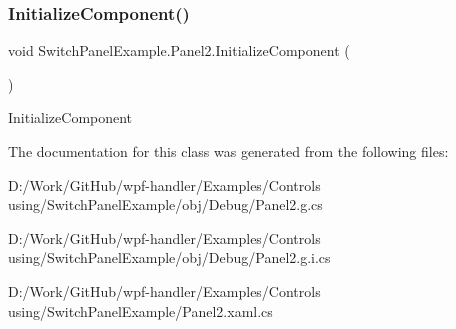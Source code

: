 \subsubsection{\texorpdfstring{Initialize\+Component()}{InitializeComponent()}\hspace{0.1cm}{\footnotesize\ttfamily [2/2]}}
{\footnotesize\ttfamily void Switch\+Panel\+Example.\+Panel2.\+Initialize\+Component (\begin{DoxyParamCaption}{ }\end{DoxyParamCaption})}



Initialize\+Component 



The documentation for this class was generated from the following files\+:\begin{DoxyCompactItemize}
\item 
D\+:/\+Work/\+Git\+Hub/wpf-\/handler/\+Examples/\+Controls using/\+Switch\+Panel\+Example/obj/\+Debug/Panel2.\+g.\+cs\item 
D\+:/\+Work/\+Git\+Hub/wpf-\/handler/\+Examples/\+Controls using/\+Switch\+Panel\+Example/obj/\+Debug/Panel2.\+g.\+i.\+cs\item 
D\+:/\+Work/\+Git\+Hub/wpf-\/handler/\+Examples/\+Controls using/\+Switch\+Panel\+Example/Panel2.\+xaml.\+cs\end{DoxyCompactItemize}
